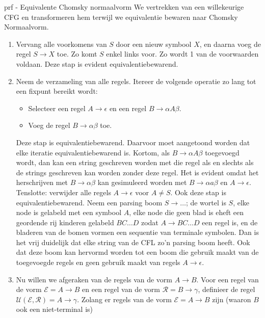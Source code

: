 \begin{prf}{prf - Equivalente Chomsky normaalvorm}
    We vertrekken van een willekeurige CFG en transformeren hem terwijl we equivalentie bewaren naar Chomsky Normaalvorm.
    \begin{enumerate}
        \item 
            Vervang alle voorkomens van $S$ door een nieuw symbool $X$, en daarna voeg de regel $S \to X$ toe. Zo komt $S$ enkel links voor.
            Zo wordt 1 van de voorwaarden voldaan. Deze stap is evident equivalentiebewarend.
        \item 
            Neem de verzameling van alle regels. Itereer de volgende operatie zo lang tot een fixpunt bereikt wordt:
            \begin{itemize}
                \item Selecteer een regel $A \to \epsilon$ en een regel $B \to \alpha A \beta$.
                \item Voeg de regel $B \to \alpha\beta$ toe.
            \end{itemize}
            Deze stap is equivalentiebewarend. Daarvoor moet aangetoond worden dat elke iteratie equivalentiebewarend is. Kortom,
            als $B \to \alpha A \beta$ toegevoegd wordt, dan kan een string geschreven worden met die regel als en slechts als de strings geschreven
            kan worden zonder deze regel. Het is evident omdat het herschrijven met $B \to \alpha\beta$ kan gesimuleerd worden met $B \to \alpha a \beta$ en $A \to \epsilon$.
            Tenslotte: verwijder alle regels $A \to \epsilon$ voor $A \neq S$. Ook deze stap is equivalentiebewarend. Neem een parsing boom
            $S \to \ldots$; de wortel is $S$, elke node is gelabeld met een symbool $A$, elke node die geen blad is eheft een geordende rij kinderen
            gelabeld $BC \ldots D$ zodat $A \to BC \ldots D$ een regel is, en de bladeren van de bomen vormen een sequentie van terminale symbolen. 
            Dan is het vrij duidelijk dat elke string van de CFL zo'n parsing boom heeft. Ook dat deze boom kan hervormd worden tot een boom
            die gebruik maakt van de toegevoegde regels en geen gebruik maakt van regels $A \to \epsilon$.
        \item
            Nu willen we afgeraken van de regels van de vorm $A \to B$. Voor een regel van de vorm $\mathcal{E} = A \to B$ en een regel van de vorm
            $\mathcal{R} = B \to \gamma$, definieer de regel $\mathcal{U}(\mathcal{E},\mathcal{R}) = A \to \gamma$. Zolang er regels van de vorm $\mathcal{E} = A \to B$ zijn (waaron $B$ ook een niet-terminal is)

\end{enumerate}
\end{prf}
